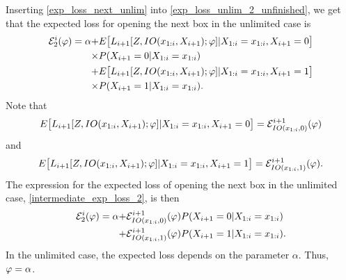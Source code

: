Inserting \eqref{exp_loss_next_unlim} into \eqref{exp_loss_unlim_2_unfinished}, we get that the expected loss for opening the next box in the unlimited case is
\begin{equation}
\label{intermediate_exp_loss_2_unlim}
    \begin{aligned}
        \mathcal{E}^i_{2}(\varphi) = \alpha 
        + &E \big[L_{i+1}[Z,IO(x_{1:i},X_{i+1});\varphi] |X_{1:i}=x_{1:i},X_{i+1}=0\big]\\
        \times & P(X_{i+1}=0|X_{1:i}=x_{1:i}) \\
        +& E \big[L_{i+1}[Z,IO(x_{1:i},X_{i+1});\varphi] |X_{1:i}=x_{1:i},X_{i+1}=1\big]\\
        \times& P(X_{i+1}=1|X_{1:i}=x_{1:i}).
    \end{aligned}
\end{equation}
Note that
\begin{equation*}
    E \big[L_{i+1}[Z,IO(x_{1:i},X_{i+1});\varphi] |X_{1:i}=x_{1:i},X_{i+1}=0\big] = \mathcal{E}^{i+1}_{IO(x_{1:i},0)}(\varphi)
\end{equation*}
and
\begin{equation*}
    E \big[L_{i+1}[Z,IO(x_{1:i},X_{i+1});\varphi] |X_{1:i}=x_{1:i},X_{i+1}=1\big] = \mathcal{E}^{i+1}_{IO(x_{1:i},1)}(\varphi).
\end{equation*}
The expression for the expected loss of opening the next box in the unlimited case, \eqref{intermediate_exp_loss_2}, is then
\begin{equation}
\label{exp_loss_next_box_unlim}
    \begin{aligned}
        \mathcal{E}^i_{2}(\varphi) 
        = \alpha + &\mathcal{E}^{i+1}_{IO(x_{1:i},0)}(\varphi) P(X_{i+1}=0|X_{1:i}=x_{1:i})\\
        + &\mathcal{E}^{i+1}_{IO(x_{1:i},1)} (\varphi)
        P(X_{i+1}=1|X_{1:i}=x_{1:i}).
    \end{aligned}
\end{equation}
In the unlimited case, the expected loss depends on the parameter $\alpha$. Thus, $\varphi = \alpha$. 

